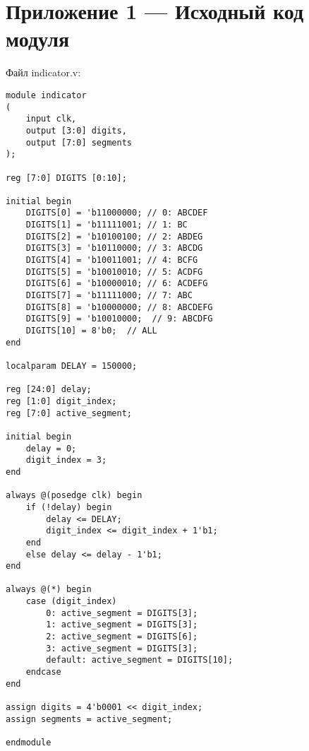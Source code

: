 \chapter{Приложение 1 --- Исходный код модуля}

Файл indicator.v:
\begingroup
    \fontsize{12pt}{12pt}\selectfont
    \linespread{1.5}
    \begin{verbatim}
module indicator 
(
    input clk,
    output [3:0] digits,
    output [7:0] segments
);

reg [7:0] DIGITS [0:10];

initial begin
    DIGITS[0] = 'b11000000; // 0: ABCDEF
    DIGITS[1] = 'b11111001; // 1: BC
    DIGITS[2] = 'b10100100; // 2: ABDEG
    DIGITS[3] = 'b10110000; // 3: ABCDG
    DIGITS[4] = 'b10011001; // 4: BCFG
    DIGITS[5] = 'b10010010; // 5: ACDFG
    DIGITS[6] = 'b10000010; // 6: ACDEFG
    DIGITS[7] = 'b11111000; // 7: ABC
    DIGITS[8] = 'b10000000; // 8: ABCDEFG
    DIGITS[9] = 'b10010000;  // 9: ABCDFG
    DIGITS[10] = 8'b0;  // ALL
end

localparam DELAY = 150000;

reg [24:0] delay;
reg [1:0] digit_index;
reg [7:0] active_segment;

initial begin
    delay = 0;
    digit_index = 3;
end

always @(posedge clk) begin
    if (!delay) begin
        delay <= DELAY;
        digit_index <= digit_index + 1'b1;
    end
    else delay <= delay - 1'b1;
end

always @(*) begin
    case (digit_index)
        0: active_segment = DIGITS[3];
        1: active_segment = DIGITS[3];
        2: active_segment = DIGITS[6];
        3: active_segment = DIGITS[3];
        default: active_segment = DIGITS[10];
    endcase
end

assign digits = 4'b0001 << digit_index;
assign segments = active_segment;

endmodule
    \end{verbatim}  
\endgroup
\endinput
